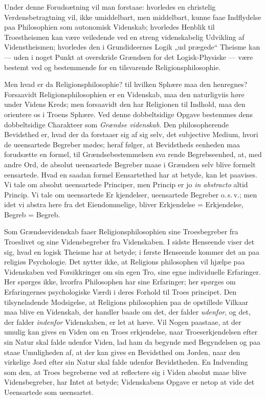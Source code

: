 \documentclass[12pt]{book}
\newcommand{\opage}[1]{\marginnote{\footnotesize\textit{[#1]}}}
\begin{document}
Under denne Forudsætning vil man forstaae: hvorledes
en christelig Verdensbetragtning vil, ikke umiddelbart, men
middelbart, kunne faae Indflydelse paa Philosophien som
autonomisk Videnskab; hvorledes Henblik til Troestheismen
kan være veiledende ved en streng videnskabelig Udvikling af
Videnstheismen; hvorledes den i Grundideernes Logik „ud\-%
prægede“ Theisme kan --- uden i noget Punkt at overskride
Grændsen for det Logisk-Physiske --- være bestemt ved og
bestemmende for en tilsvarende Religionsphilosophie.

Men hvad er da Religionsphilosophie? til hvilken Sphære
maa den henregnes? Forsaavidt Religionsphilosophien er en
Videnskab, maa den naturligviis høre under Videns Kreds;
men forsaavidt den har Religionen til Indhold, maa den
orientere os i Troens Sphære. Ved denne dobbeltsidige
Opgave bestemmes dens dobbeltsidige Charakteer som \emph{Grændse\-%
videnskab}. Den philosopherende Bevidsthed er, hvad der
da forstaaer sig af sig selv, det subjective Medium, hvori
de ueensartede Begreber mødes; heraf følger, at Bevidstheds\-%
eenheden maa forudsætte en formel, til Grændsebestemmelsen sva\-%
rende Begrebseenhed, at, med andre Ord, de absolut ueensartede
Begreber maae i Grændsen selv blive formelt eensartede. Hvad
en saadan formel Eensartethed har at betyde, kan let paavises.
Vi tale om absolut ueensartede Principer, men Princip er
\opage{137}\setcounter{footnote}{0}%
jo \textit{in abstracto} altid Princip. Vi tale om ueensartede Er\-%
kjendelser, ueensartede Begreber o.\,s.\,v.; men idet vi abstra\-%
here fra det Eiendommelige, bliver Erkjendelse = Erkjendelse,
Begreb = Begreb.

Som Grændsevidenskab faaer Religionsphilosophien sine
Troesbegreber fra Troeslivet og sine Vidensbegreber fra
Videnskaben. I sidste Henseende viser det sig, hvad en logisk
Theisme har at betyde; i første Henseende kommer det an
paa religiøs Psychologie. Det nytter ikke, at Religions\-%
philosophen vil hjælpe paa Videnskaben ved Forsikkringer om
sin egen Tro, sine egne individuelle Erfaringer. Her spørges
ikke, hvorfra Philosophen har sine Erfaringer; her spørges om
Erfaringernes psychologiske Værdi i deres Forhold til Troes\-%
principet. Den tilsyneladende Modsigelse, at Religions\-%
philosophien paa de opstillede Vilkaar maa blive en Videnskab,
der handler baade om det, der falder \emph{udenfor}, og det, der
falder \emph{indenfor} Videnskaben, er let at hæve. Vil Nogen
paastaae, at der umulig kan gives en Viden om en Troes\-%
erkjendelse, naar Troeserkjendelsen efter sin Natur skal falde
udenfor Viden, lad ham da begynde med Begyndelsen og paa\-%
staae Umuligheden af, at der kan gives en Bevidsthed om
Jorden, naar den virkelige Jord efter sin Natur skal falde
udenfor Bevidstheden. En Indvending som den, at Troes\-%
begreberne ved at reflectere sig i Viden absolut maae blive
Vidensbegreber, har Intet at betyde; Videnskabens Opgave
er netop at vide det Ueensartede som ueensartet.
\end{document}
